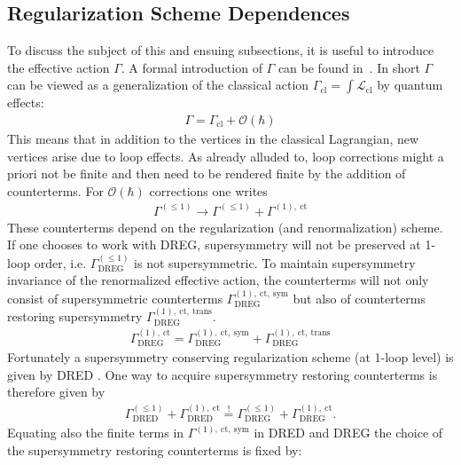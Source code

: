 \subsection{Regularization Scheme Dependences}\label{sec:RegSchemeDep}
To discuss the subject of this and ensuing subsections, it is useful to introduce the effective action $\Gamma$. A formal introduction of $\Gamma$ can be found in~\cite{Peskin}. In short $\Gamma$ can be viewed as a generalization of the classical action $\Gamma_{\mathrm{cl}} = \int \mathcal{L}_{\mathrm{cl}}$ by quantum effects:
\begin{align}
\Gamma = \Gamma_{\mathrm{cl}} + \mathcal{O}(\hbar)
\end{align}
This means that in addition to the vertices in the classical Lagrangian, new vertices arise due to loop effects. As already alluded to, loop corrections might a priori not be finite and then need to be rendered finite by the addition of counterterms. For $\mathcal{O}(\hbar)$ corrections one writes
\begin{align}
\Gamma^{(\leq 1)} \to \Gamma^{(\leq 1)} + \Gamma^{(1),\ \mathrm{ct}}
\end{align} 
These counterterms depend on the regularization (and renormalization) scheme. If one chooses to work with DREG, supersymmetry will not be preserved at 1-loop order, i.e. $\Gamma^{(\leq 1)}_{\mathrm{DREG}}$ is not supersymmetric. To maintain supersymmetry invariance of the renormalized effective action, the counterterms will not only consist of supersymmetric counterterms $\Gamma^{(1),\ \mathrm{ct,\ sym}}_{\mathrm{DREG}}$ but also of counterterms restoring supersymmetry $\Gamma^{(1),\ \mathrm{ct,\ trans}}_{\mathrm{DREG}}$. 
\begin{align}
\Gamma^{(1),\ \mathrm{ct}}_{\mathrm{DREG}} = \Gamma^{(1),\ \mathrm{ct,\ sym}}_{\mathrm{DREG}} + \Gamma^{(1),\ \mathrm{ct,\ trans}}_{\mathrm{DREG}}
\end{align}
Fortunately a supersymmetry conserving regularization scheme (at 1-loop level) is given by DRED \cite{Hollik:2001cz}. One way to acquire supersymmetry restoring counterterms is therefore given by
\begin{align}
\Gamma^{(\leq 1)}_{\mathrm{DRED}} + \Gamma^{(1),\ \mathrm{ct}}_{\mathrm{DRED}} \overset{!}{=} \Gamma^{(\leq 1)}_{\mathrm{DREG}} + \Gamma^{(1),\ \mathrm{ct}}_{\mathrm{DREG}}.
\end{align}
Equating also the finite terms in $\Gamma^{(1),\ \mathrm{ct,\ sym}}$ in DRED and DREG the choice of the supersymmetry restoring counterterms is fixed by\cite{Varso, Stockinger:2011gp, Martin:1993yx}:
